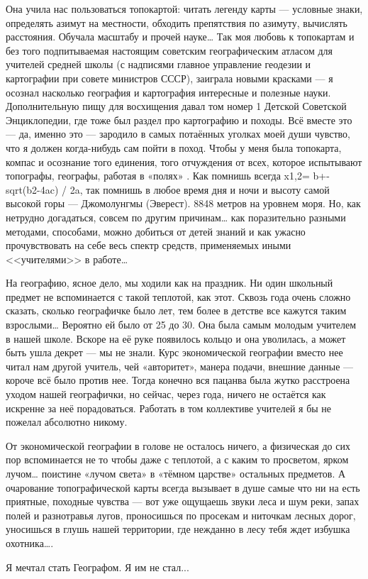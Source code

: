 Она учила нас пользоваться топокартой: читать легенду карты — условные знаки, определять азимут на местности, обходить препятствия по азимуту, вычислять расстояния. Обучала масштабу и прочей науке… Так моя любовь к топокартам и без того подпитываемая настоящим советским географическим атласом для учителей средней школы (с надписями главное управление геодезии и картографии при совете министров СССР), заиграла новыми красками — я осознал насколько география и картография интересные и полезные науки. Дополнительную пищу для восхищения давал том номер 1 Детской Советской Энциклопедии, где тоже был раздел про картографию и походы. Всё вместе это — да, именно это — зародило в самых потаённых уголках моей души чувство, что я должен когда-нибудь сам пойти в поход. Чтобы у меня была топокарта, компас и осознание того единения, того отчуждения от всех, которое испытывают топографы, географы, работая в «полях»
. 
Как помнишь всегда x1,2= b+-sqrt(b2-4ac) / 2a, так помнишь в любое время дня и ночи и высоту самой высокой горы — Джомолунгмы (Эверест). 8848 метров на уровнем моря. Но, как нетрудно догадаться, совсем по другим причинам… как поразительно разными методами, способами, можно добиться от детей знаний и как ужасно прочувствовать на себе весь спектр средств, применяемых иными <<учителями>> в работе… 

На географию, ясное дело, мы ходили как на праздник. Ни один школьный предмет не вспоминается с такой теплотой, как этот. Сквозь года очень сложно сказать, сколько географичке было лет, тем более в детстве все кажутся таким взрослыми… Вероятно ей было от 25 до 30. Она была самым молодым учителем в нашей школе. Вскоре на её руке появилось кольцо и она уволилась, а может быть ушла декрет — мы не знали. Курс экономической географии вместо нее читал нам другой учитель, чей «авторитет», манера подачи, внешние данные — короче всё было против нее. Тогда конечно вся пацанва была жутко расстроена уходом нашей географички, но сейчас, через года, ничего не остаётся как искренне за неё порадоваться. Работать в том коллективе учителей я бы не пожелал абсолютно никому. 

От экономической географии в голове не осталось ничего, а физическая до сих пор вспоминается не то чтобы даже с теплотой, а с каким то просветом, ярком лучом… поистине «лучом света» в «тёмном царстве» остальных предметов. А очарование топографической карты всегда вызывает в душе самые что ни на есть приятные, походные чувства — вот уже ощущаешь звуки леса и шум реки, запах полей и разнотравья лугов, проносишься по просекам и ниточкам лесных дорог, уносишься в глушь нашей территории, где нежданно в лесу тебя ждет избушка охотника….

Я мечтал стать Географом. Я им не стал...
